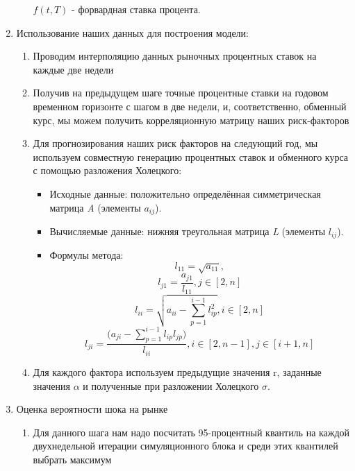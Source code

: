 \documentclass{article}
\begin{document}
\begin{enumerate}
\begin{enumerate}
            $f(t,T)$ - форвардная ставка процента.
    \end{enumerate}
        \item Использование наших данных для построения модели:
            \begin{enumerate}
                \item Проводим интерполяцию данных рыночных процентных ставок на каждые две недели
                \item Получив на предыдущем шаге точные процентные ставки на годовом временном горизонте с шагом в две недели, и, соответственно, обменный курс, мы можем получить корреляционную матрицу наших риск-факторов 
                \item Для прогнозирования наших риск факторов на следующий год, мы используем совместную генерацию процентных ставок и обменного курса с помощью разложения Холецкого:
                \begin{itemize}
                    \item Исходные данные: положительно определённая симметрическая  матрица \textit{A} (элементы $a_{ij}$).
                    \item Вычисляемые данные: нижняя треугольная матрица \textit{L} (элементы $l_{ij}$).
                    \item Формулы метода:
                        $$l_{11} = \sqrt{a_{11}},$$
                        $$l_{j1} = \frac{a_{j1}}{l_{11}}, j \in [2,n]$$
                        $$l_{ii} = \sqrt{a_{ii} - \sum^{i-1}_{p=1}{l^2_{ip}}}, i \in [2,n]$$
                        $$l_{ji} = \frac{\big( a_{ji} - \sum^{i-1}_{p=1}{l_{ip} l_{jp}} \big)}{l_{ii}}, i \in [2,n-1], j \in [i+1,n]$$
                \end{itemize}
                \item Для каждого фактора используем предыдущие значения r, заданные значения $\alpha$ и полученные при разложении Холецкого $\sigma$.
                \end{enumerate}
        \item Оценка вероятности шока на рынке
        \begin{enumerate}
                \item Для данного шага нам надо посчитать 95-процентный квантиль на каждой двухнедельной итерации симуляционного блока и среди этих квантилей выбрать максимум
        \end{enumerate}
\end{enumerate}
\end{document}
